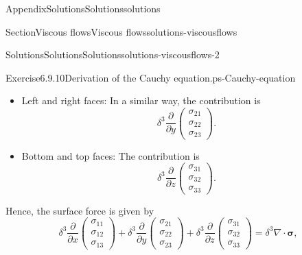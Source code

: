 \documentclass[oneside,10pt,]{book}
\newcommand{\ptxlistdisc}{\raisebox{0.3ex}{\textbullet}}
\numberwithin{equation}{section}
\newcommand{\pd}[2]{\frac{\partial#1}{\partial#2}}
\newcommand{\bsigma}{\boldsymbol{\sigma}}
\begin{document}
\begin{appendixptx}{Appendix}{Solutions}{}{Solutions}{}{}{solutions}
\begin{sectionptx}{Section}{Viscous flows}{}{Viscous flows}{}{}{solutions-viscousflows}
\begin{solutions-subsection-numberless}{Solutions}{Solutions}{}{Solutions}{}{}{solutions-viscousflows-2}
\begin{divisionsolution}{Exercise}{6.9.10}{Derivation of the Cauchy equation.}{ps-Cauchy-equation}
\begin{enumerate}[font=\bfseries,label=(\alph*),ref=\alph*]
\begin{itemize}[label=\ptxlistdisc]
\begin{equation*}
\begin{array}{c}
\end{array}\right)\right|_{x=x_0+\delta}
-\delta^2\left.\left(\begin{array}{c}
\sigma_{11}\\\sigma_{12}\\\sigma_{13}
\end{array}\right)\right|_{x=x_0}
=\delta^3\pd{}{x}\left(\begin{array}{c}
\sigma_{11}\\\sigma_{12}\\\sigma_{13}
\end{array}\right).
\end{equation*}
%
\item{}Left and right faces: In a similar way, the contribution is%
\begin{equation*}
\delta^3\pd{}{y}\left(\begin{array}{c}
\sigma_{21}\\\sigma_{22}\\\sigma_{23}
\end{array}\right).
\end{equation*}
%
\item{}Bottom and top faces: The contribution is%
\begin{equation*}
\delta^3\pd{}{z}\left(\begin{array}{c}
\sigma_{31}\\\sigma_{32}\\\sigma_{33}
\end{array}\right).
\end{equation*}
%
\end{itemize}
Hence, the surface force is given by%
\begin{equation*}
\delta^3\pd{}{x}\left(\begin{array}{c}
\sigma_{11}\\\sigma_{12}\\\sigma_{13}
\end{array}\right)
+\delta^3\pd{}{y}\left(\begin{array}{c}
\sigma_{21}\\\sigma_{22}\\\sigma_{23}
\end{array}\right)
+\delta^3\pd{}{z}\left(\begin{array}{c}
\sigma_{31}\\\sigma_{32}\\\sigma_{33}
\end{array}\right)
=\delta^3\nabla\cdot\bsigma,
\end{equation*}

\end{enumerate}
\end{divisionsolution}
\end{solutions-subsection-numberless}
\end{sectionptx}
\end{appendixptx}
\end{document}
